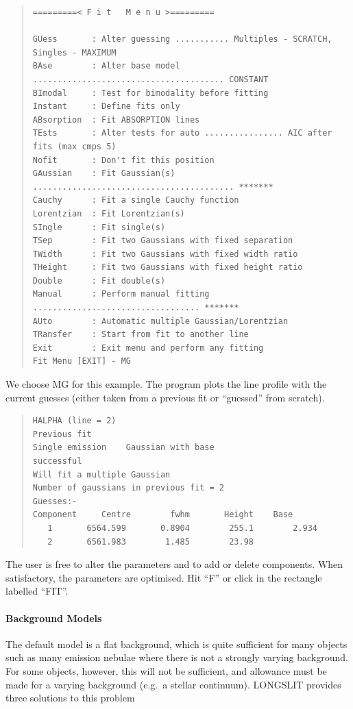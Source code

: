 \documentclass[11pt,twoside]{article}
\begin{document}
\begin{quote}
\begin{small}
\begin{verbatim}
=========< F i t   M e n u >=========

GUess       : Alter guessing ........... Multiples - SCRATCH, Singles - MAXIMUM
BAse        : Alter base model ....................................... CONSTANT
BImodal     : Test for bimodality before fitting
Instant     : Define fits only
ABsorption  : Fit ABSORPTION lines
TEsts       : Alter tests for auto ................ AIC after fits (max cmps 5)
Nofit       : Don't fit this position
GAussian    : Fit Gaussian(s) ......................................... *******
Cauchy      : Fit a single Cauchy function
Lorentzian  : Fit Lorentzian(s)
SIngle      : Fit single(s)
TSep        : Fit two Gaussians with fixed separation
TWidth      : Fit two Gaussians with fixed width ratio
THeight     : Fit two Gaussians with fixed height ratio
Double      : Fit double(s)
Manual      : Perform manual fitting .................................. *******
AUto        : Automatic multiple Gaussian/Lorentzian
TRansfer    : Start from fit to another line
Exit        : Exit menu and perform any fitting
Fit Menu [EXIT] - MG
\end{verbatim}\end{small}\end{quote}

We choose MG for this example. The program plots the line profile with
the current guesses (either taken from a previous fit or ``guessed''
from scratch).

\begin{quote}\begin{verbatim}
HALPHA (line = 2)
Previous fit
Single emission    Gaussian with base
successful
Will fit a multiple Gaussian
Number of gaussians in previous fit = 2
Guesses:-
Component     Centre        fwhm       Height    Base
   1       6564.599       0.8904        255.1        2.934
   2       6561.983        1.485        23.98
\end{verbatim}\end{quote}

The user is free to alter the parameters and to add or delete
components. When satisfactory, the parameters are optimised. Hit ``F''
or click in the rectangle labelled ``FIT''.

\paragraph{Background Models}

The default model is a flat background, which is quite sufficient for
many objects such as many emission nebulae where there is not a strongly
varying background.
For some objects, however, this will not be sufficient, and allowance
must be made for a varying background (e.g.\ a stellar continuum).
LONGSLIT provides three solutions to this problem
\end{document}
